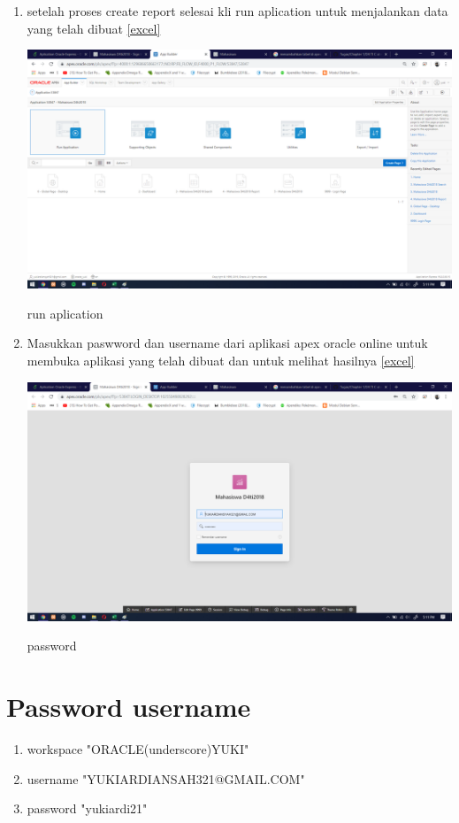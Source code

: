 \documentclass{article}
\begin{document}
\begin{enumerate}
     \item setelah proses create report selesai kli run aplication untuk menjalankan data yang telah dibuat
      \ref{excel}
    \begin{center}
         \centering
            \includegraphics[scale=0.27]{figures/DB6.png}
        \caption{run aplication}
        \label{excel}
    \end{center}
    
      \item Masukkan paswword dan username dari aplikasi apex oracle online untuk membuka aplikasi yang telah dibuat dan untuk melihat hasilnya
      \ref{excel}
    \begin{center}
         \centering
            \includegraphics[scale=0.27]{figures/DB7.png}
        \caption{password}
        \label{excel}
    \end{center}
    
\end{enumerate}

\section{Password username}
      
      \begin{enumerate}
          \item workspace "ORACLE(underscore)YUKI"
          
          \item username "YUKIARDIANSAH321@GMAIL.COM"
          
          \item password "yukiardi21"
      \end{enumerate}
      
       
\end{document}
